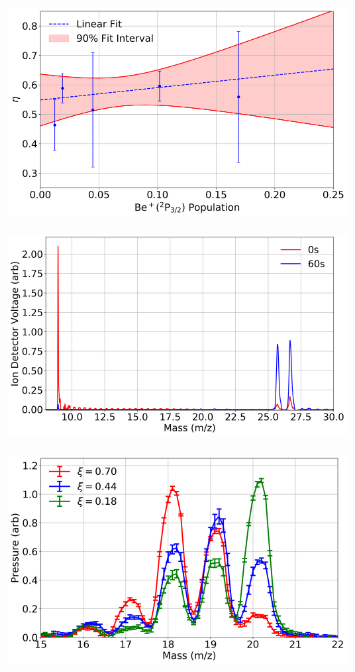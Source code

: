 \begin{figure}[H]
	\centering
	\includegraphics[width=0.8\textwidth]{images/Be_HOD_p_state.png}
	\caption{}
	\label{}
\end{figure}

\begin{figure}[H]
	\centering
	\includegraphics[width=0.8\textwidth]{images/Be_HOD_TOF.png}
	\caption{}
	\label{}
\end{figure}

\begin{figure}[H]
	\centering
	\includegraphics[width=0.8\textwidth]{images/Be_HOD_RGA.png}
	\caption{}
	\label{}
\end{figure}

